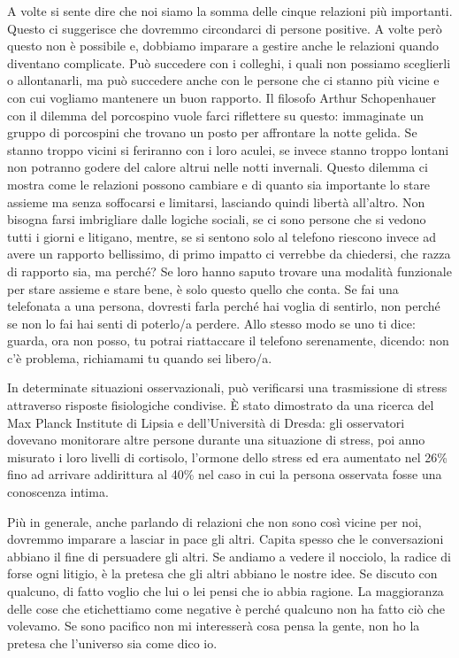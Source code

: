 \documentclass[12pt]{book} %
\begin{document}
A volte si sente dire che noi siamo la somma delle cinque relazioni più importanti. Questo ci suggerisce che dovremmo
circondarci di persone positive. A volte però questo non è possibile e, dobbiamo imparare a gestire anche le relazioni
quando diventano complicate. Può succedere con i colleghi, i quali non possiamo sceglierli o allontanarli, ma può
succedere anche con le persone che ci stanno più vicine e con cui vogliamo mantenere un buon rapporto. Il filosofo
Arthur Schopenhauer con il dilemma del porcospino vuole farci riflettere su questo: immaginate un gruppo di porcospini
che trovano un posto per affrontare la notte gelida. Se stanno troppo vicini si feriranno con i loro aculei, se invece
stanno troppo lontani non potranno godere del calore altrui nelle notti invernali. Questo dilemma ci mostra come le
relazioni possono cambiare e di quanto sia importante lo stare assieme ma senza soffocarsi e limitarsi, lasciando
quindi libertà all'altro. Non bisogna farsi imbrigliare dalle logiche sociali, se ci sono persone
che si vedono tutti i giorni e litigano, mentre, se si sentono solo al telefono riescono invece ad avere un rapporto
bellissimo, di primo impatto ci verrebbe da chiedersi, che razza di rapporto sia, ma perché? Se loro hanno saputo
trovare una modalità funzionale per stare assieme e stare bene, è solo questo quello che conta. Se fai una telefonata a
una persona, dovresti farla perché hai voglia di sentirlo, non perché se non lo fai hai senti di poterlo/a perdere.
Allo stesso modo se uno ti dice: guarda, ora non posso, tu potrai riattaccare il telefono serenamente, dicendo: non c'è
problema, richiamami tu quando sei libero/a.

\begin{mdframed}[linewidth=1pt]
In determinate situazioni osservazionali, può verificarsi una trasmissione di stress attraverso risposte fisiologiche condivise. È stato dimostrato da una ricerca del Max Planck Institute di Lipsia e dell'Università di
Dresda: gli osservatori dovevano monitorare altre persone durante una situazione di stress, poi anno misurato i loro livelli
di cortisolo, l'ormone dello stress ed era aumentato nel 26\% fino ad arrivare addirittura al 40\% nel caso in cui la
persona osservata fosse una conoscenza intima.
\end{mdframed}

Più in generale, anche parlando di relazioni che non sono così vicine per noi, dovremmo imparare a lasciar in pace gli
altri. Capita spesso che le conversazioni abbiano il fine di persuadere gli altri. Se andiamo a vedere il nocciolo, la radice di forse ogni litigio, è la pretesa che gli altri abbiano le nostre idee.
Se discuto con qualcuno, di fatto voglio che lui o lei pensi che io abbia ragione.
La maggioranza delle cose che etichettiamo come negative è perché qualcuno non ha fatto ciò che volevamo. Se sono pacifico non mi interesserà cosa pensa la gente, non ho la pretesa che l'universo sia come dico io.
\end{document}
